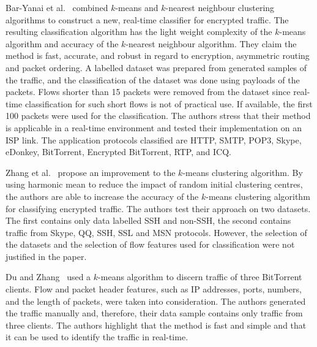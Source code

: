 Bar-Yanai et al.~\cite{BarYanai-2010-Realtime} combined $k$-means and $k$-nearest neighbour clustering algorithms to construct a new, real-time classifier for encrypted traffic. The resulting classification algorithm has the light weight complexity of the $k$-means algorithm and accuracy of the $k$-nearest neighbour algorithm. They claim the method is fast, accurate, and robust in regard to encryption, asymmetric routing and packet ordering. A labelled dataset was prepared from generated samples of the traffic, and the classification of the dataset was done using payloads of the packets. Flows shorter than 15 packets were removed from the dataset since real-time classification for such short flows is not of practical use. If available, the first 100 packets were used for the classification. The authors stress that their method is applicable in a real-time environment and tested their implementation on an ISP link. The application protocols classified are HTTP, SMTP, POP3, Skype, eDonkey, BitTorrent, Encrypted BitTorrent, RTP, and ICQ.

Zhang et al.~\cite{Zhang-2013-Encrypted} propose an improvement to the $k$-means clustering algorithm. By using harmonic mean to reduce the impact of random initial clustering centres, the authors are able to increase the accuracy of the $k$-means clustering algorithm for classifying encrypted traffic. The authors test their approach on two datasets. The first contains only data labelled SSH and non-SSH, the second contains traffic from Skype, QQ, SSH, SSL and MSN protocols. However, the selection of the datasets and the selection of flow features used for classification were not justified in the paper.

Du and Zhang~\cite{Du-2013-Design} used a $k$-means algorithm to discern traffic of three BitTorrent clients. Flow and packet header features, such as IP addresses, ports, numbers, and the length of packets, were taken into consideration. The authors generated the traffic manually and, therefore, their data sample contains only traffic from three clients. The authors highlight that the method is fast and simple and that it can be used to identify the traffic in real-time.

